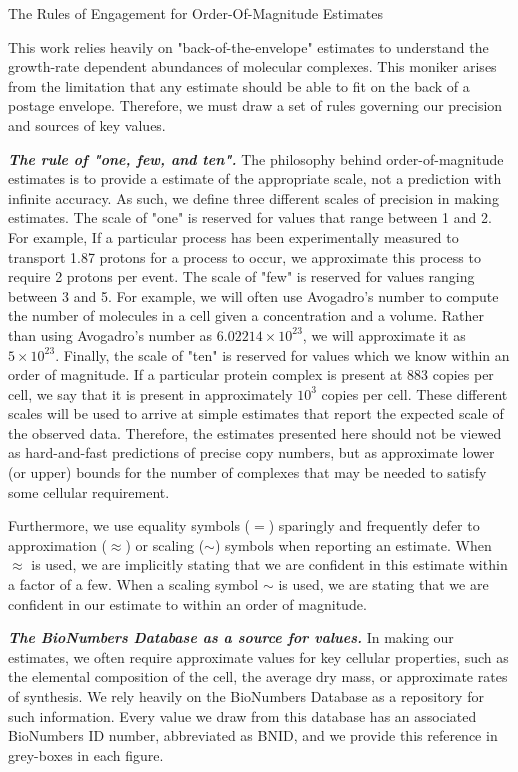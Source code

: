 \begin{featurebox}
\caption{The Rules of Engagement for Order-Of-Magnitude Estimates}
This work relies heavily on "back-of-the-envelope" estimates to
understand the growth-rate dependent abundances of molecular
complexes. This moniker arises from the limitation that any estimate should be
able to fit on the back of a postage envelope. Therefore, we must draw a set of
rules governing our precision and sources of key values.

\textbf{\itshape The rule of "one, few, and ten".} The philosophy behind
order-of-magnitude estimates is to provide a estimate of the appropriate scale,
not a prediction with infinite accuracy. As such, we define three different
scales of precision in making estimates. The scale of "one" is reserved for
values that range between 1 and 2. For example, If a particular process has been
experimentally measured to transport 1.87 protons for a process to occur, we approximate
this process to require 2 protons per event. The scale of "few" is reserved for
values ranging between 3 and 5. For example, we will often use Avogadro's number
to compute the number of molecules in a cell given a concentration and a volume.
Rather than using Avogadro's number as $6.02214 \times 10^{23}$, we will
approximate it as $5 \times 10^{23}$. Finally, the scale of "ten" is reserved
for values which we know within an order of magnitude. If a particular protein
complex is present at 883 copies per cell, we say that it is present in
approximately $10^3$ copies per cell. These different scales will be used
to arrive at simple estimates that report the expected scale of the
observed data. Therefore, the estimates  presented here should not be viewed as
hard-and-fast predictions of precise copy numbers, but as approximate lower (or upper)
bounds for the number of complexes that may be needed to satisfy some cellular requirement.

Furthermore, we use equality symbols ($=$) sparingly and frequently defer to
approximation ($\approx$) or scaling ($\sim$) symbols when reporting an
estimate. When $\approx$ is used, we are implicitly stating that
we are confident in this estimate within a factor of a few. When a scaling
symbol $\sim$ is used, we are stating that we are confident in our estimate to
within an order of magnitude.

\textbf{\itshape The BioNumbers Database as a source for values.} In making our
estimates, we often require approximate values for key cellular properties, such
as the elemental composition of the cell, the average dry mass, or approximate
rates of synthesis. We rely heavily on the BioNumbers Database \citep{milo2010}
as a repository for such information. Every value we draw from this database has
an associated BioNumbers ID number, abbreviated as BNID, and we provide this
reference in grey-boxes in each  figure.



\end{featurebox}
